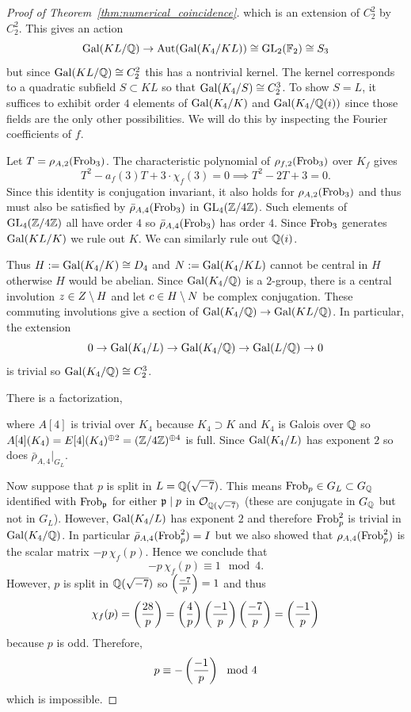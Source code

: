 \documentclass[main.tex]{subfiles}
\begin{document}
\begin{proof}[Proof of Theorem~\ref{thm:numerical_coincidence}]
which is an extension of $C_2^2$ by $C_2^2$. This gives an action
\[ \operatorname{\mathrm{Gal}}(KL/\mathbb{Q}) \to \operatorname{\mathrm{Aut}}(\operatorname{\mathrm{Gal}}(K_4 / KL)) \cong \mathrm{GL}_2(\mathbb{F}_2) \cong S_3 \]
but since $\operatorname{\mathrm{Gal}}(KL/\mathbb{Q}) \cong C_2^2$ this has a nontrivial kernel. The kernel corresponds to a quadratic subfield $S \subset KL$ so that $\operatorname{\mathrm{Gal}}(K_4 / S) \cong C_2^3$. To show $S = L$, it suffices to exhibit order $4$ elements of $\operatorname{\mathrm{Gal}}(K_4/K)$ and $\operatorname{\mathrm{Gal}}(K_4/\mathbb{Q}(i))$ since those fields are the only other possibilities. We will do this by inspecting the Fourier coefficients of $f$.
\par 
Let $T = \rho_{A,2}(\operatorname{\mathrm{Frob}}_3)$. The characteristic polynomial of $\rho_{f,2}(\operatorname{\mathrm{Frob}}_3)$ over $K_f$ gives
\[ T^2 - a_f(3) T + 3 \cdot \chi_f(3) = 0 \implies T^2 - 2 T + 3 = 0. \]
Since this identity is conjugation invariant, it also holds for $\rho_{A,2}(\operatorname{\mathrm{Frob}}_3)$ and thus must also be satisfied by $\bar{\rho}_{A,4}(\operatorname{\mathrm{Frob}}_3)$ in $\mathrm{GL}_4(\mathbb{Z}/4\mathbb{Z})$. Such elements of $\mathrm{GL}_4(\mathbb{Z}/4\mathbb{Z})$ all have order $4$ so $\bar{\rho}_{A,4}(\operatorname{\mathrm{Frob}}_3)$ has order $4$. Since $\operatorname{\mathrm{Frob}}_3$ generates $\operatorname{\mathrm{Gal}}(KL/K)$ we rule out $K$. We can similarly rule out $\mathbb{Q}(i)$.
\par 
Thus $H := \operatorname{\mathrm{Gal}}(K_4/K) \cong D_4$ and $N := \operatorname{\mathrm{Gal}}(K_4/KL)$ cannot be central in $H$ otherwise $H$ would be abelian. Since $\operatorname{\mathrm{Gal}}(K_4/\mathbb{Q})$ is a $2$-group, there is a central involution $z \in Z \setminus H$ and let $c \in H \setminus N$ be complex conjugation. These commuting involutions give a section of $\operatorname{\mathrm{Gal}}(K_4/\mathbb{Q}) \to \operatorname{\mathrm{Gal}}(KL/\mathbb{Q})$. In particular, the extension
\[ 0 \to \operatorname{\mathrm{Gal}}(K_4/L) \to \operatorname{\mathrm{Gal}}(K_4/\mathbb{Q}) \to \operatorname{\mathrm{Gal}}(L/\mathbb{Q}) \to 0 \]
is trivial so $\operatorname{\mathrm{Gal}}(K_4/\mathbb{Q}) \cong C_2^3$.
\par 
There is a factorization,
\begin{center}
\end{center}
where $A[4]$ is trivial over $K_4$ because $K_4 \supset K$ and $K_4$ is Galois over $\mathbb{Q}$ so $A[4](K_4) = E[4](K_4)^{\oplus 2} = (\mathbb{Z}/4\mathbb{Z})^{\oplus 4}$ is full. Since $\operatorname{\mathrm{Gal}}(K_4/L)$ has exponent $2$ so does $\bar{\rho}_{A,4}|_{G_L}$.
\par 
Now suppose that $p$ is split in $L = \mathbb{Q}(\sqrt{-7})$. This means $\operatorname{\mathrm{Frob}}_p \in G_{L} \subset G_{\mathbb{Q}}$ identified with $\operatorname{\mathrm{Frob}}_{\mathfrak{p}}$ for either $\mathfrak{p} \mid p$ in $\mathcal{O}_{\mathbb{Q}(\sqrt{-7})}$ (these are conjugate in $G_{\mathbb{Q}}$ but not in $G_{L}$). However, $\operatorname{\mathrm{Gal}}(K_4/L)$ has exponent $2$ and therefore $\operatorname{\mathrm{Frob}}_p^2$ is trivial in $\operatorname{\mathrm{Gal}}(K_4 / \mathbb{Q})$. In particular $\bar{\rho}_{A,4}(\operatorname{\mathrm{Frob}}_p^2) = I$ but we also showed that $\rho_{A,4}(\operatorname{\mathrm{Frob}}_p^2)$ is the scalar matrix $-p \, \chi_f(p)$. Hence we conclude that
\[ -p \, \chi_f(p) \equiv 1 \mod 4. \]
However, $p$ is split in $\mathbb{Q}(\sqrt{-7})$ so $\left(\frac{-7}{p}\right) = 1$ and thus
\[ \chi_f(p) = \left(\frac{28}{p}\right) = \left(\frac{4}{p}\right) \left(\frac{-1}{p}\right) \left(\frac{-7}{p}\right) = \left(\frac{-1}{p}\right) \]
because $p$ is odd. Therefore,
\[ p \equiv -\left(\frac{-1}{p}\right) \mod 4 \]
which is impossible.
\end{proof}
\end{document}
